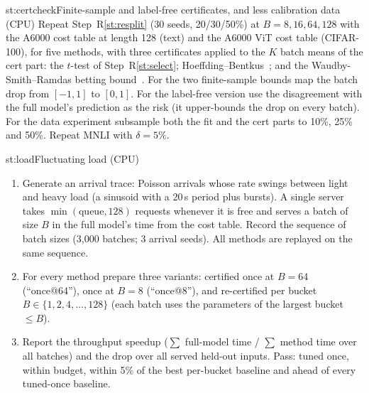 \begin{step}{st:certcheck}{Finite-sample and label-free certificates, and less calibration data (CPU)}
Repeat Step~R\ref{st:resplit} (30 seeds, 20/30/50\%) at $B=8,16,64,128$ with the A6000 cost table at length 128 (text)
and the A6000 ViT cost table (CIFAR-100), for five methods, with three certificates applied to the $K$ batch means of
the cert part: the $t$-test of Step~R\ref{st:select}; Hoeffding--Bentkus~\cite{rcps}; and the Waudby-Smith--Ramdas betting
bound~\cite{wsr}.
For the two finite-sample bounds map the batch drop from $[-1,1]$ to $[0,1]$. For the label-free version use the
disagreement with the full model's prediction as the risk (it upper-bounds the drop on every batch). For the data
experiment subsample both the fit and the cert parts to 10\%, 25\% and 50\%. Repeat MNLI with $\delta=5\%$.
\end{step}

\begin{step}{st:load}{Fluctuating load (CPU)}
\begin{enumerate}
  \item Generate an arrival trace: Poisson arrivals whose rate swings between light and heavy load (a sinusoid with a
  20\,s period plus bursts). A single server takes $\min(\text{queue},128)$ requests whenever it is free and serves a
  batch of size $B$ in the full model's time from the cost table. Record the sequence of batch sizes (3{,}000
  batches; 3 arrival seeds). All methods are replayed on the same sequence.
  \item For every method prepare three variants: certified once at $B=64$ (``once@64''), once at $B=8$
  (``once@8''), and re-certified per bucket $B\in\{1,2,4,\dots,128\}$ (each batch uses the parameters of the largest
  bucket $\le B$).
  \item Report the throughput speedup ($\sum$ full-model time / $\sum$ method time over all batches) and the drop over
  all served held-out inputs. Pass: tuned once, within budget, within 5\% of the best per-bucket baseline and ahead
  of every tuned-once baseline.
\end{enumerate}
\end{step}

